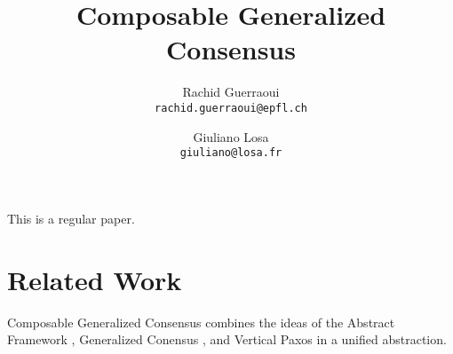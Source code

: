 




\title{Composable Generalized Consensus}

\author{
  Rachid Guerraoui\\
  \texttt{rachid.guerraoui@epfl.ch}
  \and
  Giuliano Losa\\
  \texttt{giuliano@losa.fr}
}

\date{}



\maketitle



\vspace{2cm}
\begin{center}
This is a regular paper.
\end{center}

\newpage



%


\section{Related Work}
\label{sec:related}

\begin{comment}
SMR is often implemented using a sequence of instances of Consensus.
There are numerous examples of consensus algorithms in the literature.
However, Composable Generalized Consensus is based on Generalized Consensus. 
In Generalized Consensus \cite{Lamport05GeneralizeConsensus}, the learners of a
SMR algorithm repeatedly learn new values belonging to a \emph{C-struct set}. A
C-struct can be seen as a data structure encoding  sequences of commands modulo
the ordering of commands that commute. The advantage of Generalized
Consensus over Consensus is that
two servers which receive commuting commands in different orders can still reach
agreement on C-structs without further synchronization. 
Our Composable Generalized Consensus can also use C-structs, with the same advantages
as Generalized Consensus. 
\end{comment}

Composable Generalized Consensus combines the ideas of the Abstract Framework \cite{GuerraouiETAL10Next700BftProtocols}, Generalized Conensus  \cite{Lamport05GeneralizeConsensus}, and Vertical Paxos \cite{LamportMalkhiZhou09VerticalPaxosPrimarybackupReplication} in a
unified abstraction. 

